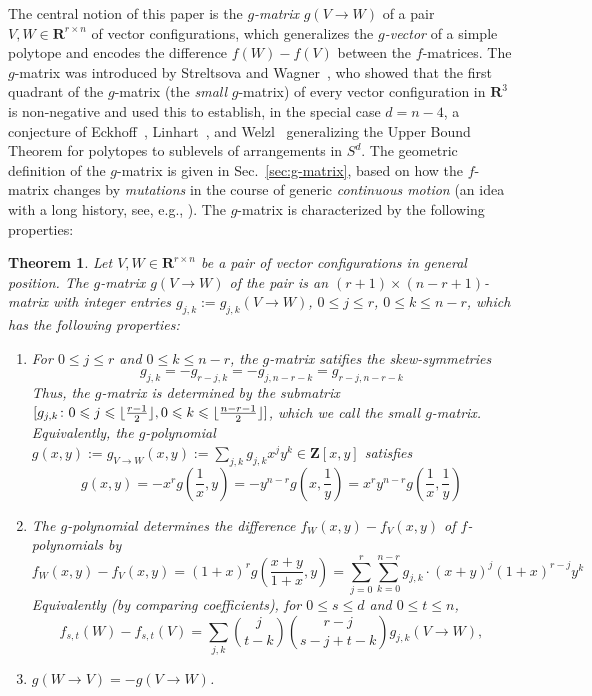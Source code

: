 \documentclass[11pt]{article}
\newtheorem{theorem}{Theorem}
\renewcommand{\leq}{\leqslant}
\newcommand{\R}{\mathbf{R}}
\newcommand{\Z}{\mathbf{Z}}
\DeclarePairedDelimiter\floor{\lfloor}{\rfloor}
\begin{document}
%
The central notion of this paper is the \emph{$g$-matrix} $g(V\to W)$ of a pair $V,W \in \R^{r\times n}$ of vector configurations, which generalizes the \emph{$g$-vector} of a simple polytope and encodes the difference $f(W)-f(V)$ between the $f$-matrices. The $g$-matrix was introduced by Streltsova and Wagner~\cite{SW:Arcs}, who showed that the first quadrant of the $g$-matrix (the \emph{small} $g$-matrix) of every vector configuration in $\R^3$ is non-negative and used this to establish, in the special case $d=n-4$, a conjecture of Eckhoff~\cite{Eckhoff:1993aa}, Linhart~\cite{Linhart:1994aa}, and Welzl~\cite{Welzl:2001aa} generalizing the Upper Bound Theorem for polytopes to sublevels of arrangements in $S^d$.
%
The geometric definition of the $g$-matrix is given in Sec.~\ref{sec:g-matrix}, based on how the $f$-matrix changes by \emph{mutations} in the course of generic \emph{continuous motion} (an idea with a long history, see, e.g., \cite{Andrzejak:1998aa}). The $g$-matrix is characterized by the following properties:
\begin{theorem} 
\label{thm:f-g}
Let $V,W \in \R^{r\times n}$ be a pair of vector configurations in general position. 
%
The \emph{$g$-matrix} $g(V\to W)$ of the pair is an $(r+1)\times (n-r+1)$-matrix  with integer entries $g_{j,k}:=g_{j,k}(V\to W)$, $0\leq j\leq r$, $0\leq k \leq n-r$, which has the following properties:  
\begin{enumerate}
\item For $0\leq j\leq r$ and $0\leq k\leq n-r$, the $g$-matrix satifies the skew-symmetries
\begin{equation}
\label{eq:g-skew}
g_{j,k}=-g_{r-j,k}=-g_{j,n-r-k}=g_{r-j,n-r-k}
\end{equation}
Thus, the $g$-matrix is determined by the submatrix $[g_{j,k}\colon 0\leq j \leq \floor{\frac{r-1}{2}}, 0\leq k \leq \floor{\frac{n-r-1}{2}}]$, which we call the \emph{small $g$-matrix}. 
Equivalently, the \emph{$g$-polynomial} $g(x,y):=g_{V\to W}(x,y):=\sum_{j,k} g_{j,k} x^j y^k \in \Z[x,y]$ satisfies
\begin{equation}
\label{eq:g-poly-skew}
\textstyle g(x,y)=-x^rg(\frac{1}{x},y)=-y^{n-r}g(x,\frac{1}{y})=x^ry^{n-r}g(\frac{1}{x},\frac{1}{y})
\end{equation}
\item The $g$-polynomial determines the difference $f_W(x,y)-f_V(x,y)$ of $f$-polynomials by
\begin{equation}
\label{eq:f-poly-g-poly}
f_W(x,y)-f_V(x,y) = (1+x)^r g (\textstyle \frac{x+y}{1+x},y)=\sum_{j=0}^r \sum_{k=0}^{n-r} g_{j,k}\cdot (x+y)^j (1+x)^{r-j} y^k
\end{equation}
Equivalently (by comparing coefficients), for $0\leq s\leq d$ and $0\leq t\leq n$,
\begin{equation}
\label{eq:f-g-coefficients}
f_{s,t}(W)-f_{s,t}(V) = \sum_{j,k} \binom{j}{t-k}\binom{r-j}{s-j+t-k} g_{j,k}(V\to W),
\end{equation}
\item $g(W\to V)=-g(V\to W)$.
\end{enumerate}
\end{theorem}
\end{document}
